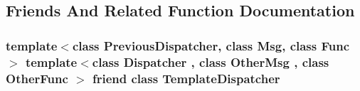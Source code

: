 \subsection{Friends And Related Function Documentation}
\hypertarget{classmessaging_1_1TemplateDispatcher_ac52eebabf93ac84bc8eacc5c67e6ca9f}{
\subsubsection[{Template\-Dispatcher}]{\setlength{\rightskip}{0pt plus 5cm}template$<$class Previous\-Dispatcher, class Msg, class Func$>$ template$<$class Dispatcher , class Other\-Msg , class Other\-Func $>$ friend class {\bf Template\-Dispatcher}\hspace{0.3cm}{\ttfamily [friend]}}}\label{classmessaging_1_1TemplateDispatcher_ac52eebabf93ac84bc8eacc5c67e6ca9f}


